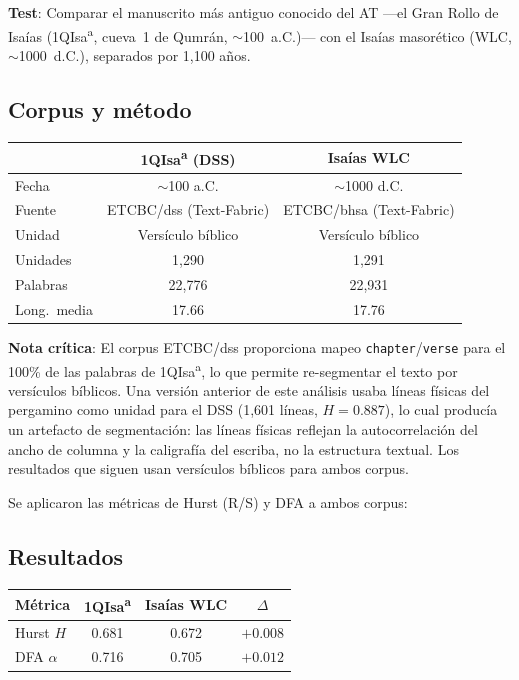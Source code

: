 \documentclass[12pt,a4paper]{article}
\begin{document}
\textbf{Test}: Comparar el manuscrito m\'as antiguo conocido del AT ---el Gran Rollo
de Isa\'ias (1QIsa\textsuperscript{a}, cueva~1 de Qumr\'an, $\sim$100~a.C.)--- con el
Isa\'ias masor\'etico (WLC, $\sim$1000~d.C.), separados por 1,100 a\~nos.

\subsection{Corpus y m\'etodo}

\begin{center}
\begin{tabular}{lcc}
\toprule
& \textbf{1QIsa\textsuperscript{a} (DSS)} & \textbf{Isa\'ias WLC} \\
\midrule
Fecha            & $\sim$100 a.C.   & $\sim$1000 d.C. \\
Fuente           & ETCBC/dss (Text-Fabric) & ETCBC/bhsa (Text-Fabric) \\
Unidad           & Vers\'iculo b\'iblico & Vers\'iculo b\'iblico \\
Unidades         & 1,290            & 1,291 \\
Palabras         & 22,776           & 22,931 \\
Long.\ media     & 17.66            & 17.76 \\
\bottomrule
\end{tabular}
\end{center}

\noindent
\textbf{Nota cr\'itica}: El corpus ETCBC/dss proporciona mapeo
\texttt{chapter}/\texttt{verse} para el 100\% de las palabras de 1QIsa\textsuperscript{a},
lo que permite re-segmentar el texto por vers\'iculos b\'iblicos.
Una versi\'on anterior de este an\'alisis usaba l\'ineas f\'isicas del pergamino
como unidad para el DSS (1,601 l\'ineas, $H = 0.887$), lo cual produc\'ia un
artefacto de segmentaci\'on: las l\'ineas f\'isicas reflejan la autocorrelaci\'on
del ancho de columna y la caligraf\'ia del escriba, no la estructura textual.
Los resultados que siguen usan vers\'iculos b\'iblicos para ambos corpus.

Se aplicaron las m\'etricas de Hurst (R/S) y DFA a ambos corpus:

\subsection{Resultados}

\begin{center}
\begin{tabular}{lccc}
\toprule
\textbf{M\'etrica} & \textbf{1QIsa\textsuperscript{a}} & \textbf{Isa\'ias WLC} & \textbf{$\Delta$} \\
\midrule
Hurst $H$      & 0.681  & 0.672  & $+0.008$ \\
DFA $\alpha$    & 0.716  & 0.705  & $+0.012$ \\
\bottomrule
\end{tabular}
\end{center}
\end{document}
